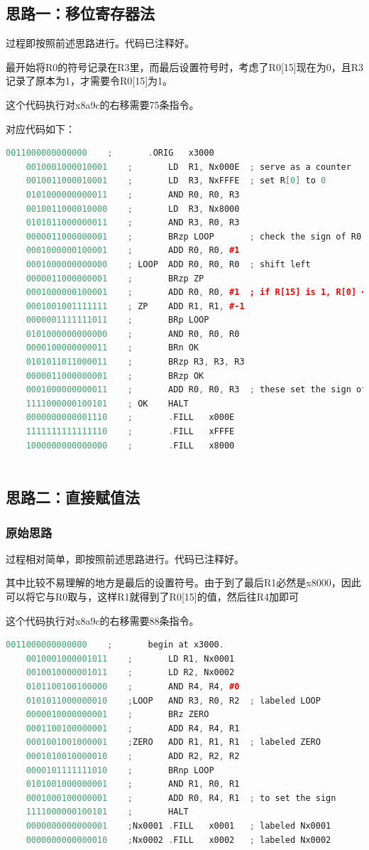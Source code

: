 \documentclass[UTF8]{article}
\begin{document}
	\subsection{思路一：移位寄存器法}
	过程即按照前述思路进行。代码已注释好。\par
	最开始将R0的符号记录在R3里，而最后设置符号时，考虑了R0[15]现在为0，且R3记录了原本为1，才需要令R0[15]为1。\par
	这个代码执行对x8a9c的右移需要75条指令。\par
	对应代码如下：
	\begin{lstlisting}[language=C++, name=移位寄存器法(.hex)]
	0011000000000000	;		.ORIG	x3000
	0010001000010001	;		LD	R1, Nx000E	; serve as a counter
	0010011000010001	;		LD	R3, NxFFFE	; set R[0] to 0
	0101000000000011	;		AND	R0, R0, R3
	0010011000010000	;		LD	R3, Nx8000
	0101011000000011	;		AND	R3, R0, R3
	0000011000000001	;		BRzp LOOP		; check the sign of R0
	0001000000100001	;		ADD	R0, R0, #1
	0001000000000000	; LOOP	ADD	R0, R0, R0	; shift left
	0000011000000001	;		BRzp ZP
	0001000000100001	;		ADD	R0, R0, #1	; if R[15] is 1, R[0] <- 1
	0001001001111111	; ZP	ADD	R1, R1, #-1
	0000001111111011	;		BRp	LOOP
	0101000000000000	;		AND	R0, R0, R0
	0000100000000011	;		BRn	OK
	0101011011000011	;		BRzp R3, R3, R3
	0000011000000001	;		BRzp OK
	0001000000000011	;		ADD	R0, R0, R3	; these set the sign of R0
	1111000000100101	; OK	HALT
	0000000000001110	;		.FILL	x000E	
	1111111111111110	;		.FILL	xFFFE	
	1000000000000000	;		.FILL	x8000	
	
	\end{lstlisting}
	
	\subsection{思路二：直接赋值法}
	\subsubsection{原始思路}
	过程相对简单，即按照前述思路进行。代码已注释好。\par
	其中比较不易理解的地方是最后的设置符号。由于到了最后R1必然是x8000，因此可以将它与R0取与，这样R1就得到了R0[15]的值，然后往R4加即可\par
	这个代码执行对x8a9c的右移需要88条指令。\par
	\begin{lstlisting}[language=C++, name=直接赋值法(.bin)]
	0011000000000000	; 		begin at x3000.
	0010001000001011	; 		LD R1, Nx0001
	0010010000001011	;		LD R2, Nx0002
	0101100100100000	; 		AND R4, R4, #0
	0101011000000010	;LOOP	AND R3, R0, R2	; labeled LOOP
	0000010000000001	; 		BRz ZERO
	0001100100000001	; 		ADD R4, R4, R1	
	0001001001000001	;ZERO	ADD R1, R1, R1	; labeled ZERO
	0001010010000010	; 		ADD R2, R2, R2
	0000101111111010	; 		BRnp LOOP
	0101001000000001	; 		AND R1, R0, R1	
	0001000100000001	; 		ADD R0, R4, R1	; to set the sign
	1111000000100101	; 		HALT
	0000000000000001	;Nx0001	.FILL	x0001	; labeled Nx0001
	0000000000000010	;Nx0002	.FILL	x0002	; labeled Nx0002	
	\end{lstlisting}\par
\end{document}
